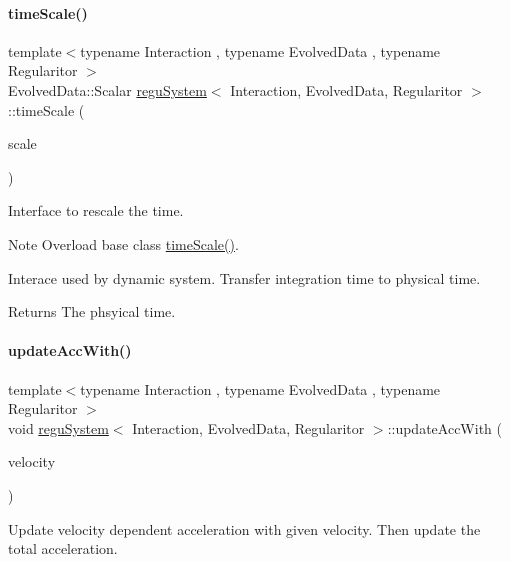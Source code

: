\paragraph{\texorpdfstring{time\+Scale()}{timeScale()}}
{\footnotesize\ttfamily template$<$typename Interaction , typename Evolved\+Data , typename Regularitor $>$ \\
Evolved\+Data\+::\+Scalar \mbox{\hyperlink{classregu_system}{regu\+System}}$<$ Interaction, Evolved\+Data, Regularitor $>$\+::time\+Scale (\begin{DoxyParamCaption}\item[{\mbox{\hyperlink{classregu_system_aca8ee2c387943164ee3ea68370fc3ac0}{Scalar}}}]{scale }\end{DoxyParamCaption})}



Interface to rescale the time. 

\begin{DoxyNote}{Note}
Overload base class \mbox{\hyperlink{classregu_system_ad9aa4594055c550b56cda4242d498d45}{time\+Scale()}}.
\end{DoxyNote}
Interace used by dynamic system. Transfer integration time to physical time. \begin{DoxyReturn}{Returns}
The phsyical time. 
\end{DoxyReturn}
\mbox{\label{classregu_system_a5928c1085fa45b17bfd0da8661819852}} 
\paragraph{\texorpdfstring{update\+Acc\+With()}{updateAccWith()}}
{\footnotesize\ttfamily template$<$typename Interaction , typename Evolved\+Data , typename Regularitor $>$ \\
void \mbox{\hyperlink{classregu_system}{regu\+System}}$<$ Interaction, Evolved\+Data, Regularitor $>$\+::update\+Acc\+With (\begin{DoxyParamCaption}\item[{\mbox{\hyperlink{classregu_system_aa4ecefb5c437230b994171e231450be8}{Vector\+Array}} \&}]{velocity }\end{DoxyParamCaption})\hspace{0.3cm}{\ttfamily [private]}}



Update velocity dependent acceleration with given velocity. Then update the total acceleration. 

